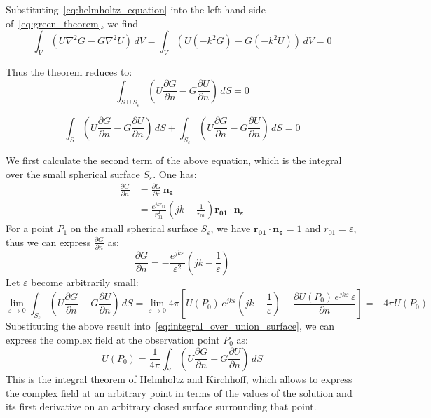 \documentclass{article}
\begin{document}
Substituting~\cref{eq:helmholtz_equation} into the left-hand side of~\cref{eq:green_theorem}, we find
\begin{equation}
\int_V (U \nabla^2 G - G \nabla^2 U) \, dV = \int_V (U (-k^2 G) - G (-k^2 U)) \, dV = 0
\end{equation}

Thus the theorem reduces to:
\begin{equation}\label{eq:integral_theorem}
\int_{S \cup S_\varepsilon} \left( U \frac{\partial G}{\partial n} - G \frac{\partial U}{\partial n} \right) \,dS = 0
\end{equation} 

\begin{equation}\label{eq:integral_over_union_surface}
    \int_{S} \left( U \frac{\partial G}{\partial n} - G \frac{\partial U}{\partial n} \right) \,dS + \int_{S_\varepsilon} \left( U \frac{\partial G}{\partial n} - G \frac{\partial U}{\partial n} \right) \,dS = 0
\end{equation}

We first calculate the second term of the above equation, which is the integral over the small spherical surface $S_\varepsilon$. One has:
\begin{align}
    \frac{\partial G}{\partial n} &= \frac{\partial G}{\partial r} \, \mathbf{n_\varepsilon} \\
    &= \frac{e^{jk r_{01}}}{r_{01}^2}  \left(jk - \frac{1}{r_{01}}\right) \mathbf{r_{01}} \cdot \mathbf{n_\varepsilon} 
\end{align}
For a point $P_1$ on the small spherical surface $S_\varepsilon$, we have  $\mathbf{r_{01}} \cdot \mathbf{n_\varepsilon} = 1$ and $r_{01} = \varepsilon$, thus we can express $\frac{\partial G}{\partial n}$ as:
\begin{equation}
    \frac{\partial G}{\partial n} = -\frac{e^{jk \varepsilon}}{\varepsilon^2}  \left(jk - \frac{1}{\varepsilon}\right)
\end{equation}
Let $\varepsilon$ become arbitrarily small:
\begin{equation}
\lim_{\varepsilon \to 0} \int_{S_\varepsilon} \left( U \frac{\partial G}{\partial n} - G \frac{\partial U}{\partial n} \right) \,dS =
\lim_{\varepsilon \to 0} 4 \pi  \left[U(P_0) \, e^{jk \varepsilon}  \left(jk - \frac{1}{\varepsilon}\right) - \frac{\partial U(P_0) \, e^{jk \varepsilon} \,\varepsilon}{\partial n} \right] = -4 \pi U(P_0)
\end{equation}
Substituting the above result into~\cref{eq:integral_over_union_surface}, we can express the complex field at the observation point $P_0$ as:
\begin{equation}\label{eq:Helmholtz_Kirchhoff}
U(P_0) = \frac{1}{4 \pi} \int_{S} \left( U \frac{\partial G}{\partial n} - G \frac{\partial U}{\partial n} \right) \,dS
\end{equation}
This is the integral theorem of Helmholtz and Kirchhoff, which allows to express the complex field at an arbitrary point in terms of the values of the solution and its first derivative on an arbitrary closed surface surrounding that point.
\end{document}
